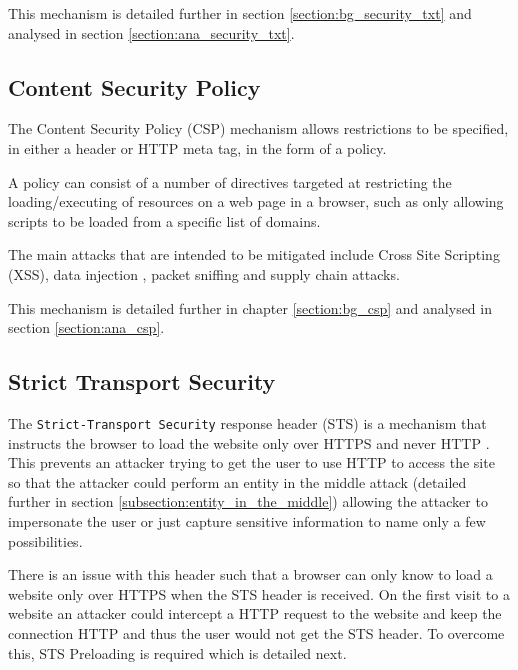 \documentclass{mscreport}
\begin{document}
\vspace{0.3cm} \noindent
This mechanism is detailed further in section \ref{section:bg_security_txt} and analysed in section \ref{section:ana_security_txt}.


\subsection{Content Security Policy}
The Content Security Policy (CSP) mechanism allows restrictions to be specified, in either a header or HTTP meta tag, in the form of a policy.

\vspace{0.3cm} \noindent
A policy can consist of a number of directives targeted at restricting the loading/executing of resources on a web page in a browser, such as only allowing scripts to be loaded from a specific list of domains.

\vspace{0.3cm} \noindent
The main attacks that are intended to be mitigated include Cross Site Scripting (XSS), data injection , packet sniffing and supply chain attacks.

\vspace{0.3cm} \noindent
This mechanism is detailed further in chapter \ref{section:bg_csp} and analysed in section \ref{section:ana_csp}.


\subsection{Strict Transport Security}
The \texttt{Strict-Transport Security} response header (STS) is a mechanism that instructs the browser to load the website only over HTTPS and never HTTP \cite{Hodges2012-pe}. This prevents an attacker trying to get the user to use HTTP to access the site so that the attacker could perform an entity in the middle attack (detailed further in section \ref{subsection:entity_in_the_middle}) allowing the attacker to impersonate the user or just capture sensitive information to name only a few possibilities.

\vspace{0.3cm} \noindent
There is an issue with this header such that a browser can only know to load a website only over HTTPS when the STS header is received. On the first visit to a website an attacker could intercept a HTTP request to the website and keep the connection HTTP and thus the user would not get the STS header. To overcome this, STS Preloading is required which is detailed next.
\end{document}
